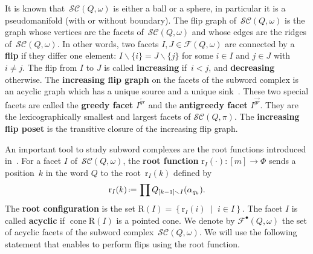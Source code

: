\documentclass[reqno]{amsart}
\theoremstyle{definition}
\newcommand{\set}[2]{\left\{ #1 \;\middle|\; #2 \right\}} %
\newcommand{\ssm}{\smallsetminus} %
\newcommand{\eqdef}{\mbox{\,\raisebox{0.2ex}{\scriptsize\ensuremath{\mathrm:}}\ensuremath{=}\,}} %
\DeclareMathOperator{\cone}{cone} %
\newcommand{\defn}[1]{\textbf{\textsf{\color{PineGreen} #1}}} %
\newcommand{\subwordComplex}{\mathcal{SC}} %
\newcommand{\Roots}{\mathrm{R}} %
\newcommand{\rootFunction}[2]{\mathrm{r}_{#1}(#2)} %
\newcommand{\subwordFacets}{\mathcal{F}} %
\newcommand{\subwordAcyclicFacets}{\mathcal{F}^\bullet} %
\newcommand{\greedyFacet}{I^{\overleftarrow{gr}}} %
\newcommand{\antiGreedyFacet}{I^{\overrightarrow{gr}}} %
\begin{document}
It is known that~$\subwordComplex(Q,\omega)$ is either a ball or a sphere, in particular it is a pseudomanifold (with or without boundary).
The flip graph of~$\subwordComplex(Q,\omega)$ is the graph whose vertices are the facets of~$\subwordComplex(Q,\omega)$ and whose edges are the ridges of~$\subwordComplex(Q,\omega)$.
In other words, two facets $I,J \in \subwordFacets(Q,\omega)$ are connected by a \defn{flip} if they differ one element: $I \ssm \{i\} = J \ssm \{j\}$ for some $i\in I$ and $j\in J$ with~$i \ne j$.
The flip from $I$ to $J$ is called \defn{increasing} if~$i < j$, and \defn{decreasing} otherwise.
The \defn{increasing flip graph} on the facets of the subword complex is an acyclic graph which has a unique source and a unique sink~\cite{Pilaud-greedyFlipTree, PilaudStump-ELlabelings}.
These two special facets are called the \defn{greedy facet} $\greedyFacet$ and the \defn{antigreedy facet} $\antiGreedyFacet$.
They are the lexicographically smallest and largest facets of $\subwordComplex(Q,\pi)$.
The \defn{increasing flip poset} is the transitive closure of the increasing flip graph.

An important tool to study subword complexes are the root functions introduced in~\cite{CeballosLabbeStump}.
For a facet $I$ of~$\subwordComplex(Q,\omega)$, the \defn{root function} $\rootFunction{I}{\cdot}:[m]\rightarrow \Phi$ sends a position~$k$ in the word $Q$ to the root~$ \rootFunction{I}{k}$ defined by 
\[
\rootFunction{I}{k} \eqdef \prod Q_{[k-1]\ssm I}(\alpha_{q_k}).
\]
The \defn{root configuration} is the set $\Roots(I)=\set{\rootFunction{I}{i}}{i\in I}$.
The facet $I$ is called \defn{acyclic} if $\cone \Roots(I)$ is a pointed cone.
We denote by $\subwordAcyclicFacets(Q,\omega)$ the set of acyclic facets of the subword complex~$\subwordComplex(Q,\omega)$.
We will use the following statement that enables to perform flips using the root function.
\end{document}
